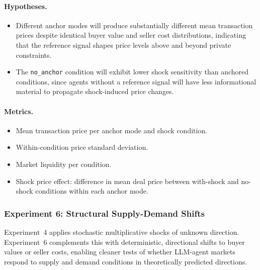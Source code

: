 \paragraph{Hypotheses.}
\begin{itemize}
    \item[\textbf{H-4ext-a.}] Different anchor modes will produce substantially different mean transaction prices despite identical buyer value and seller cost distributions, indicating that the reference signal shapes price levels above and beyond private constraints.
    \item[\textbf{H-4ext-b.}] The \texttt{no\_anchor} condition will exhibit lower shock sensitivity than anchored conditions, since agents without a reference signal will have less informational material to propagate shock-induced price changes.
\end{itemize}

\paragraph{Metrics.}
\begin{itemize}
    \item Mean transaction price per anchor mode and shock condition.
    \item Within-condition price standard deviation.
    \item Market liquidity per condition.
    \item Shock price effect: difference in mean deal price between with-shock and no-shock conditions within each anchor mode.
\end{itemize}

\subsubsection{Experiment 6: Structural Supply-Demand Shifts}
\label{sec:exp-supply-demand}

Experiment~4 applies stochastic multiplicative shocks of unknown direction.  Experiment~6 complements this with deterministic, directional shifts to buyer values or seller costs, enabling cleaner tests of whether LLM-agent markets respond to supply and demand conditions in theoretically predicted directions.

